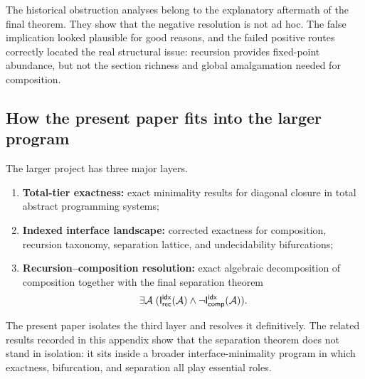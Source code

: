 \documentclass[11pt]{article}
\begin{document}
\begin{remark}
The historical obstruction analyses belong to the explanatory aftermath of the final theorem.  They show that the negative resolution is not ad hoc.  The false implication looked plausible for good reasons, and the failed positive routes correctly located the real structural issue: recursion provides fixed-point abundance, but not the section richness and global amalgamation needed for composition.
\end{remark}

\subsection{How the present paper fits into the larger program}\label{app:fit}

The larger project has three major layers.

\begin{enumerate}[label=(\arabic*),leftmargin=2em]
\item \textbf{Total-tier exactness:} exact minimality results for diagonal closure in total abstract programming systems;
\item \textbf{Indexed interface landscape:} corrected exactness for composition, recursion taxonomy, separation lattice, and undecidability bifurcations;
\item \textbf{Recursion--composition resolution:} exact algebraic decomposition of composition together with the final separation theorem
\[
\exists \mathcal{A}\;(\mathsf{I}_{\mathsf{rec}}^{\mathsf{idx}}(\mathcal{A})\wedge \neg \mathsf{I}_{\mathsf{comp}}^{\mathsf{idx}}(\mathcal{A})).
\]
\end{enumerate}

The present paper isolates the third layer and resolves it definitively.  The related results recorded in this appendix show that the separation theorem does not stand in isolation: it sits inside a broader interface-minimality program in which exactness, bifurcation, and separation all play essential roles.
\end{document}

